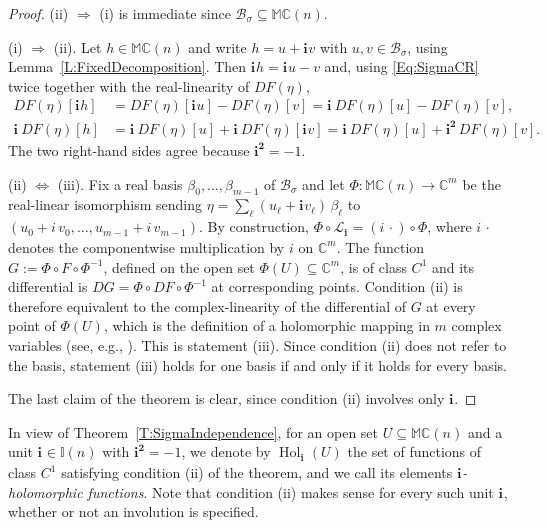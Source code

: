\documentclass[12pt]{amsart}
\theoremstyle{plain}
\theoremstyle{definition}
\numberwithin{equation}{section}
\newcommand{\im}[1]{\mathbf{ i_{#1}}}
\newcommand{\ims}[1]{\mathbf{ i_{#1}^2}}
\newcommand{\mC}{\mathbb{C}}
\newcommand{\mM}{\mathbb{M}}
\newcommand{\mI}{\mathbb{I}}
\newcommand{\cL}{\mathcal{L}}
\newcommand{\cB}{\mathcal{B}}
\newcommand{\ra}{\rightarrow}
\newcommand{\Ra}{\Rightarrow}
\DeclareMathOperator{\hol}{Hol}
\begin{document}
    \begin{proof}
    (ii) $\Ra$ (i) is immediate since $\cB_\sigma \subseteq \mM \mC(n)$.

    (i) $\Ra$ (ii). Let $h \in \mM \mC(n)$ and write $h = u + \im{} v$ with $u , v \in \cB_\sigma$, using Lemma~\ref{L:FixedDecomposition}. Then $\im{} h = \im{} u - v$ and, using \eqref{Eq:SigmaCR} twice together with the real-linearity of $DF (\eta )$,
    \begin{align*}
    DF (\eta ) [\im{} h] &= DF (\eta )[\im{} u] - D F (\eta ) [v] = \im{}\, DF (\eta )[u] - DF (\eta ) [v] , \\
    \im{}\, DF (\eta ) [h] &= \im{}\, DF (\eta) [u] + \im{}\, DF (\eta ) [\im{} v] = \im{}\, DF (\eta )[u] + \ims{}\, DF (\eta )[v].
    \end{align*}
    The two right-hand sides agree because $\ims{} = -1$.

    (ii) $\Leftrightarrow$ (iii). Fix a real basis $\beta_0 , \ldots , \beta_{m-1}$ of $\cB_\sigma$ and let $\Phi : \mM \mC(n) \ra \mC^m$ be the real-linear isomorphism sending $\eta = \sum_\ell (u_\ell + \im{} v_\ell )\, \beta_\ell$ to $(u_0 + i\, v_0 , \ldots , u_{m-1} + i\, v_{m-1})$. By construction, $\Phi \circ \cL_{\im{}} = ( i \, \cdot ) \circ \Phi$, where $i \, \cdot$ denotes the componentwise multiplication by $i$ on $\mC^m$. The function $G := \Phi \circ F \circ \Phi^{-1}$, defined on the open set $\Phi (U ) \subseteq \mC^m$, is of class $C^1$ and its differential is $DG = \Phi \circ DF \circ \Phi^{-1}$ at corresponding points. Condition (ii) is therefore equivalent to the complex-linearity of the differential of $G$ at every point of $\Phi (U)$, which is the definition of a holomorphic mapping in $m$ complex variables (see, e.g., \cite[Chapter 1]{Krantz2001}). This is statement (iii). Since condition (ii) does not refer to the basis, statement (iii) holds for one basis if and only if it holds for every basis.

    The last claim of the theorem is clear, since condition (ii) involves only $\im{}$.
    \end{proof}

In view of Theorem~\ref{T:SigmaIndependence}, for an open set $U \subseteq \mM \mC(n)$ and a unit $\im{} \in \mI(n)$ with $\ims{} = -1$, we denote by $\hol_{\im{}} (U)$ the set of functions of class $C^1$ satisfying condition (ii) of the theorem, and we call its elements \emph{$\im{}$-holomorphic functions}. Note that condition (ii) makes sense for every such unit $\im{}$, whether or not an involution is specified. 
\end{document}

